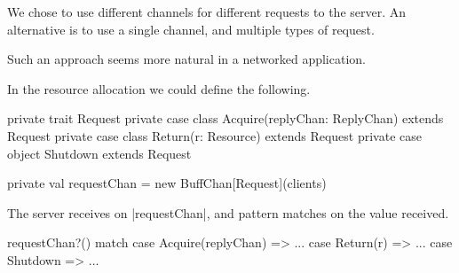 







\begin{slide}

We chose to use different channels for different requests to the server.  An
alternative is to use a single channel, and multiple types of request.

Such an approach seems more natural in a networked application.
\end{slide}



\begin{slide}

In the resource allocation we could define the following.
%
\begin{scala}
private trait Request
private case class Acquire(replyChan: ReplyChan) extends Request
private case class Return(r: Resource) extends Request
private case object Shutdown extends Request

private val requestChan = new BuffChan[Request](clients)
\end{scala}

The server receives on |requestChan|, and pattern matches on the value
received.
\begin{scala}
  requestChan?() match{
    case Acquire(replyChan) => ...
    case Return(r) => ...
    case Shutdown => ...
  }
\end{scala}
\end{slide}

